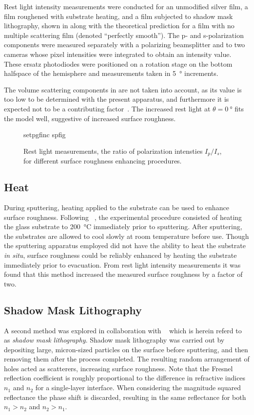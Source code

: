 Rest light intensity measurements were conducted for an unmodified silver
film, a film roughened with substrate heating, and a film subjected to
shadow mask lithography, shown in  along with the
theoretical prediction for a film with no multiple scattering film (denoted
``perfectly smooth'').  The p- and s-polarization components were measured
separately with a polarizing beamsplitter and to two cameras whose pixel
intensities were integrated to obtain an intensity value.  These ersatz
photodiodes were positioned on a rotation stage on the bottom halfspace of
the hemisphere and measurements taken in \SI{5}{\degree} increments.

The volume scattering components in  are not taken
into account, as its value is too low to be determined with the present
apparatus, and furthermore it is expected not to be a contributing
factor~\cite{kretschmann1972decay}.  The increased rest light at
$\theta=\SI{0}{\degree}$ fits the model well, suggestive of increased
surface roughness.
\begin{figure}[ht]
 \centering
 {setpgfinc}
 {spfig}
 \caption{Rest light measurements, the ratio of polarization intensties
									$I_p/I_s$,  for different surface roughness enhancing procedures.}
\label{fig:spratio}
\end{figure}

\subsection{Heat}
During sputtering, heating applied to the substrate can be used to enhance
surface roughness.  Following
~\cite{horstmann1977multiple}, the experimental procedure
consisted of heating the glass substrate to \SI{200}{\celsius} immediately
prior to sputtering.  After sputtering, the substrates are allowed to cool
slowly at room temperature before use.  Though the sputtering apparatus
employed did not have the ability to heat the substrate \textit{in situ},
surface roughness could be reliably enhanced by heating the substrate
immediately prior to evacuation.  From rest light intensity measurements it
was found that this method increased the measured surface roughness by a
factor of two.

\subsection{Shadow Mask Lithography}
A second method was explored in collaboration with
~\cite{huang2014speckle} which is herein referd to as
\textit{shadow mask lithography}.  Shadow mask lithography was carried out
by depositing large, micron-sized particles on the surface before
sputtering, and then removing them after the process completed.  The
resulting random arrangement of holes acted as scatterers, increasing
surface roughness.  Note that the Fresnel reflection coefficient is roughly
proportional to the difference in refractive indices $n_1$ and $n_2$ for a
single-layer interface.  When considering the magnitude squared reflectance
the phase shift is discarded, resulting in the same reflectance for both
$n_1>n_2$ and $n_2>n_1$.

